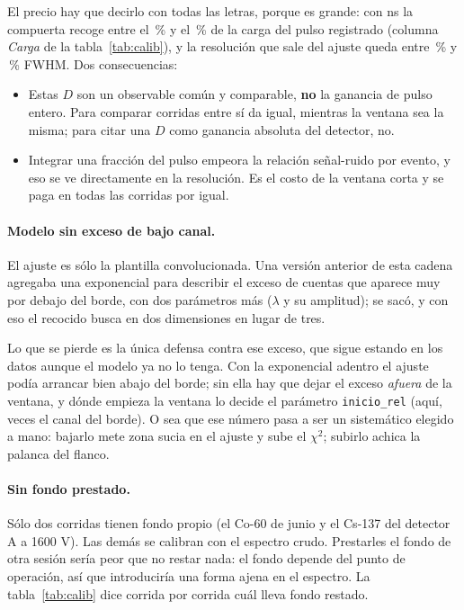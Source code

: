 \documentclass[11pt,a4paper]{article}
\begin{document}
El precio hay que decirlo con todas las letras, porque es grande: con
\PostFijo{} ns la compuerta recoge entre el \CargaMin\,\% y el \CargaMax\,\% de
la carga del pulso registrado (columna \emph{Carga} de la
tabla~\ref{tab:calib}), y la resolución que sale del ajuste queda entre
\FwhmMin\,\% y \FwhmMax\,\% FWHM. Dos consecuencias:

\begin{itemize}
\item Estas $D$ son un observable común y comparable, \textbf{no} la ganancia
      de pulso entero. Para comparar corridas entre sí da igual, mientras la
      ventana sea la misma; para citar una $D$ como ganancia absoluta del
      detector, no.
\item Integrar una fracción del pulso empeora la relación señal-ruido por
      evento, y eso se ve directamente en la resolución. Es el costo de la
      ventana corta y se paga en todas las corridas por igual.
\end{itemize}

\paragraph{Modelo sin exceso de bajo canal.} El ajuste es sólo la plantilla
convolucionada. Una versión anterior de esta cadena agregaba una exponencial
para describir el exceso de cuentas que aparece muy por debajo del borde, con
dos parámetros más ($\lambda$ y su amplitud); se sacó, y con eso el recocido
busca en dos dimensiones en lugar de tres.

Lo que se pierde es la única defensa contra ese exceso, que sigue estando en
los datos aunque el modelo ya no lo tenga. Con la exponencial adentro el ajuste
podía arrancar bien abajo del borde; sin ella hay que dejar el exceso
\emph{afuera} de la ventana, y dónde empieza la ventana lo decide el parámetro
\texttt{inicio\_rel} (aquí, \InicioRel{} veces el canal del borde). O sea que
ese número pasa a ser un sistemático elegido a mano: bajarlo mete zona sucia en
el ajuste y sube el $\chi^2$; subirlo achica la palanca del flanco.

\paragraph{Sin fondo prestado.} Sólo dos corridas tienen fondo propio (el
Co-60 de junio y el Cs-137 del detector A a 1600 V). Las demás se calibran con
el espectro crudo. Prestarles el fondo de otra sesión sería peor que no restar
nada: el fondo depende del punto de operación, así que introduciría una forma
ajena en el espectro. La tabla~\ref{tab:calib} dice corrida por corrida cuál
lleva fondo restado.
\end{document}

